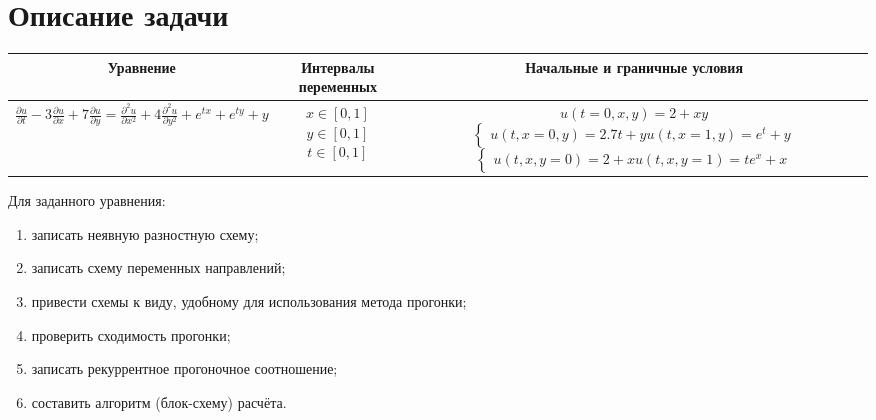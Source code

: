 \documentclass[12pt, a4paper]{report}
\begin{document}
	\section*{Описание задачи}
	\large
	\begin{center}
		\begin{tabular}{||c|c|c||}
			\hline
			Уравнение & \makecell{Интервалы \\ переменных} & Начальные и граничные условия \\

			\hline
			\small 
			$ \frac{\partial u}{\partial t} - 3\frac{\partial u}{\partial x} + 7\frac{\partial u}{\partial y} = \frac{\partial^{2} u}{\partial x^{2}} + 4\frac{\partial^{2} u}{\partial y^{2}} + e^{tx} + e^{ty} + y $ & \makecell{$ x \in [0, 1] $ \\ $ y \in [0, 1] $ \\ $ t \in [0, 1] $} & \makecell{$ u(t = 0, x, y) = 2 + xy $ \\ $\begin{cases} u(t, x = 0, y) = 2.7t + y \\ u(t, x = 1, y) = e^{t} + y \end{cases}$ \\ $\begin{cases} u(t, x, y = 0) = 2 + x \\ u(t, x, y = 1) = te^{x} + x \end{cases}$} \\

			\hline
		\end{tabular}
	\end{center}

	Для заданного уравнения:
	\begin{enumerate}
		\item записать неявную разностную схему;
		\item записать схему переменных направлений;
		\item привести схемы к виду, удобному для использования метода прогонки;
		\item проверить сходимость прогонки;
		\item записать рекуррентное прогоночное соотношение;
		\item составить алгоритм (блок-схему) расчёта.
	\end{enumerate}
\end{document}
